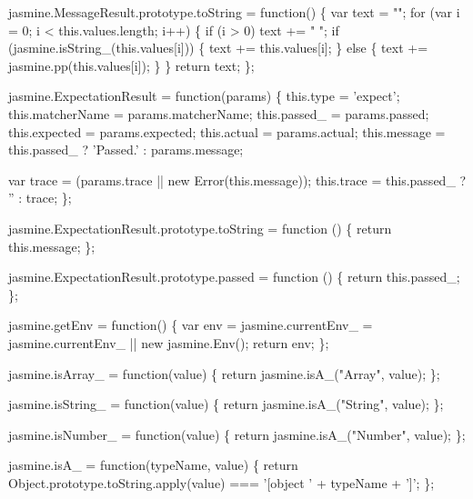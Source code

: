 \begin{DoxyCodeInclude}
jasmine.MessageResult.prototype.toString = \textcolor{keyword}{function}() \{
  var text = \textcolor{stringliteral}{""};
  \textcolor{keywordflow}{for} (var i = 0; i < this.values.length; i++) \{
    \textcolor{keywordflow}{if} (i > 0) text += \textcolor{stringliteral}{" "};
    \textcolor{keywordflow}{if} (jasmine.isString\_(\textcolor{keyword}{this}.values[i])) \{
      text += this.values[i];
    \} \textcolor{keywordflow}{else} \{
      text += jasmine.pp(this.values[i]);
    \}
  \}
  \textcolor{keywordflow}{return} text;
\};

jasmine.ExpectationResult = \textcolor{keyword}{function}(params) \{
  this.type = \textcolor{stringliteral}{'expect'};
  this.matcherName = params.matcherName;
  this.passed\_ = params.passed;
  this.expected = params.expected;
  this.actual = params.actual;
  this.message = this.passed\_ ? \textcolor{stringliteral}{'Passed.'} : params.message;

  var trace = (params.trace || \textcolor{keyword}{new} Error(this.message));
  this.trace = this.passed\_ ? \textcolor{stringliteral}{''} : trace;
\};

jasmine.ExpectationResult.prototype.toString = \textcolor{keyword}{function} () \{
  \textcolor{keywordflow}{return} this.message;
\};

jasmine.ExpectationResult.prototype.passed = \textcolor{keyword}{function} () \{
  \textcolor{keywordflow}{return} this.passed\_;
\};

jasmine.getEnv = \textcolor{keyword}{function}() \{
  var env = jasmine.currentEnv\_ = jasmine.currentEnv\_ || \textcolor{keyword}{new} jasmine.Env();
  \textcolor{keywordflow}{return} env;
\};

jasmine.isArray\_ = \textcolor{keyword}{function}(value) \{
  \textcolor{keywordflow}{return} jasmine.isA\_(\textcolor{stringliteral}{"Array"}, value);
\};

jasmine.isString\_ = \textcolor{keyword}{function}(value) \{
  \textcolor{keywordflow}{return} jasmine.isA\_(\textcolor{stringliteral}{"String"}, value);
\};

jasmine.isNumber\_ = \textcolor{keyword}{function}(value) \{
  \textcolor{keywordflow}{return} jasmine.isA\_(\textcolor{stringliteral}{"Number"}, value);
\};

jasmine.isA\_ = \textcolor{keyword}{function}(typeName, value) \{
  \textcolor{keywordflow}{return} Object.prototype.toString.apply(value) === \textcolor{stringliteral}{'[object '} + typeName + \textcolor{charliteral}{']'};
\};


\end{DoxyCodeInclude}
